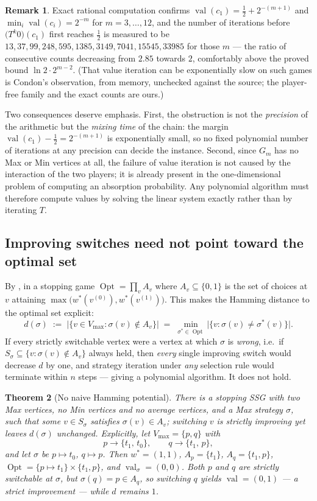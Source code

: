 \documentclass[11pt]{article}
\theoremstyle{plain}
\newtheorem{theorem}{Theorem}[section]
\theoremstyle{definition}
\newtheorem{remark}[theorem]{Remark}
\DeclareMathOperator{\val}{val}
\DeclareMathOperator{\Opt}{Opt}
\newcommand{\Vmax}{V_{\max}}
\begin{document}
\begin{remark}
Exact rational computation confirms
$\val(c_1)=\tfrac12+2^{-(m+1)}$ and $\min_i\val(c_i)=2^{-m}$ for
$m=3,\dots,12$, and the number of iterations before
$\bigl(T^{k}0\bigr)(c_1)$ first reaches $\tfrac12$ is measured to be
$13,37,99,248,595,1385,3149,7041,15545,33985$ for those $m$ --- the ratio
of consecutive counts decreasing from $2.85$ towards $2$, comfortably
above the proved bound $\ln2\cdot 2^{m-2}$. (That value iteration can be
exponentially slow on such games is Condon's observation, from memory,
unchecked against the source; the player-free family and the exact counts
are ours.)

Two consequences deserve emphasis. First, the obstruction is not the
\emph{precision} of the arithmetic but the \emph{mixing time} of the
chain: the margin $\val(c_1)-\tfrac12=2^{-(m+1)}$ is exponentially small,
so no fixed polynomial number of iterations at any precision can decide
the instance. Second, since $G_m$ has no Max or Min vertices at all, the
failure of value iteration is not caused by the interaction of the two
players; it is already present in the one-dimensional problem of
computing an absorption probability. Any polynomial algorithm must
therefore compute values by solving the linear system exactly rather than
by iterating $T$.
\end{remark}

\subsection{Improving switches need not point toward the optimal set}

By , in a stopping game $\Opt=\prod_{v}A_v$ where
$A_v\subseteq\{0,1\}$ is the set of choices at $v$ attaining
$\max\bigl(w^\ast(v^{(0)}),w^\ast(v^{(1)})\bigr)$. This makes the
Hamming distance to the optimal set explicit:
\[
  d(\sigma)\;:=\;\bigl|\{v\in\Vmax : \sigma(v)\notin A_v\}\bigr|
  \;=\;\min_{\sigma^\ast\in\Opt}\bigl|\{v:\sigma(v)\ne\sigma^\ast(v)\}\bigr| .
\]
If every strictly switchable vertex were a vertex at which $\sigma$ is
\emph{wrong}, i.e.\ if $S_\sigma\subseteq\{v:\sigma(v)\notin A_v\}$ always
held, then \emph{every} single improving switch would decrease $d$ by
one, and strategy iteration under \emph{any} selection rule would
terminate within $n$ steps --- giving a polynomial algorithm. It does
not hold.

\begin{theorem}[No naive Hamming potential]\label{thm:hamming-refuted}
There is a stopping SSG with two Max vertices, no Min vertices and no
average vertices, and a Max strategy $\sigma$, such that some
$v\in S_\sigma$ satisfies $\sigma(v)\in A_v$; switching $v$ is strictly
improving yet leaves $d(\sigma)$ unchanged. Explicitly, let
$\Vmax=\{p,q\}$ with
\[
  p\to\{t_1,\,t_0\},\qquad q\to\{t_1,\,p\},
\]
and let $\sigma$ be $p\mapsto t_0$, $q\mapsto p$. Then $w^\ast=(1,1)$,
$A_p=\{t_1\}$, $A_q=\{t_1,p\}$, $\Opt=\{p\mapsto t_1\}\times\{t_1,p\}$,
and $\val_\sigma=(0,0)$. Both $p$ and $q$ are strictly switchable at
$\sigma$, but $\sigma(q)=p\in A_q$, so switching $q$ yields
$\val=(0,1)$ --- a strict improvement --- while $d$ remains $1$.
\end{theorem}
\end{document}
